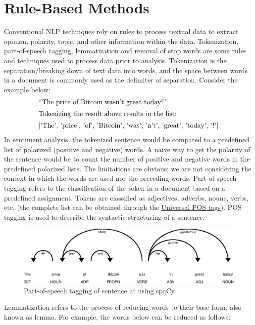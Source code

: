 \section{Rule-Based Methods}
Conventional NLP techniques rely on rules to process textual data to extract opinion, polarity, topic, and other information within the data. Tokenization, part-of-speech tagging, lemmatization and removal of stop words are some rules and techniques used to process data prior to analysis. Tokenization is the separation/breaking down of text data into words, and the space between words in a document is commonly used as the delimiter of separation. Consider the example below:
\begin{align}
    \label{POS_example_sent}
    &\text{“The price of Bitcoin wasn’t great today!”}\\
\intertext{Tokenizing the result above results in the list:}
    &\text{['The', 'price', 'of', 'Bitcoin', 'was',  'n’t', 'great', 'today', '!']}
\end{align}
In sentiment analysis, the tokenized sentence would be compared to a predefined list of polarized (positive and negative) words. A naive way to get the polarity of the sentence would be to count the number of positive and negative words in the predefined polarized lists. The limitations are obvious; we are not considering the context in which the words are used nor the preceding words. Part-of-speech tagging refers to the classification of the token in a document based on a predefined assignment. Tokens are classified as adjectives, adverbs, nouns, verbs, etc. (the complete list can be obtained through the \href{https://universaldependencies.org/u/pos/}{Universal POS tags}). POS tagging is used to describe the syntactic structuring of a sentence.
\begin{figure}[H]
    \centering
    \includegraphics[scale=0.8]{CHAPTER_4/POS_tagging.eps}
    \caption{Part-of-speech tagging of sentence at  using spaCy}
    \label{PSO_EXAMPLE}
  \end{figure}
\noindent Lemmatization refers to the process of reducing words  to their base form, also known as lemma. For example, the words below can be reduced as follows:
